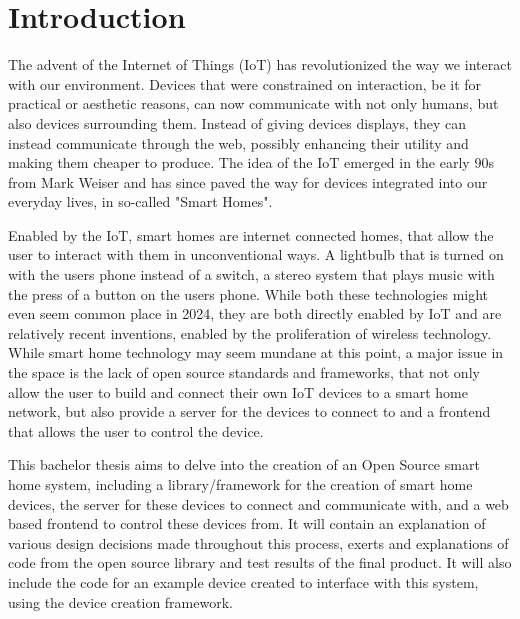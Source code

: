 \chapter{Introduction} \label{cha:intro}
The advent of the Internet of Things (IoT) has revolutionized the way we interact with our environment. Devices that were constrained on interaction, be it for practical or aesthetic reasons, can now communicate with not only humans, but also devices surrounding them. Instead of giving devices displays, they can instead communicate through the web, possibly enhancing their utility and making them cheaper to produce. The idea of the IoT emerged in the early 90s from Mark Weiser \cite{FromInternetToIot} and has since paved the way for devices integrated into our everyday lives, in so-called "Smart Homes".

Enabled by the IoT, smart homes are internet connected homes, that allow the user to interact with them in unconventional ways. A lightbulb that is turned on with the users phone instead of a switch, a stereo system that plays music with the press of a button on the users phone. While both these technologies might even seem common place in 2024, they are both directly enabled by IoT and are relatively recent inventions, enabled by the proliferation of wireless technology. While smart home technology may seem mundane at this point, a major issue in the space is the lack of open source standards and frameworks, that not only allow the user to build and connect their own IoT devices to a smart home network, but also provide a server for the devices to connect to and a frontend that allows the user to control the device.

This bachelor thesis aims to delve into the creation of an Open Source smart home system, including a library/framework for the creation of smart home devices, the server for these devices to connect and communicate with, and a web based frontend to control these devices from. It will contain an explanation of various design decisions made throughout this process, exerts and explanations of code from the open source library and test results of the final product. It will also include the code for an example device created to interface with this system, using the device creation framework.



